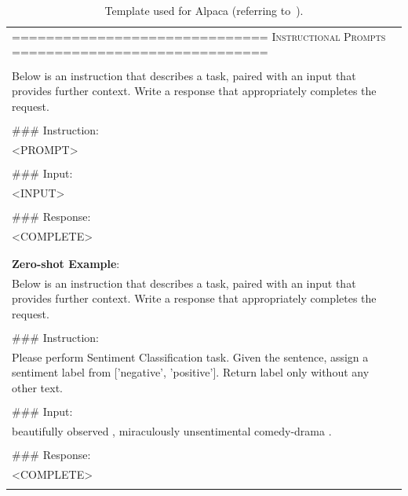     
    

\begin{table}[!htbp]
\small
    \centering
    \colorbox{gray!8}{
    \begin{tabular}{@{}p{\textwidth}}
    \toprule
    
    
    ============================== 
    \textsc{Instructional Prompts} ============================== \\\\

    Below is an instruction that describes a task, paired with an input that provides further context. Write a response that appropriately completes the request.\\\\

    $\#\#\#$ Instruction: \\
    <PROMPT> \\\\
    
    $\#\#\#$ Input:  \\
    <INPUT> \\\\
    
    $\#\#\#$ Response:  \\
    <COMPLETE> \\\\

    \midrule \\
    \textbf{Zero-shot Example}: \\
    Below is an instruction that describes a task, paired with an input that provides further context. Write a response that appropriately completes the request.\\\\

    $\#\#\#$ Instruction: \\
    Please perform Sentiment Classification task. Given the sentence, assign a sentiment label from [’negative’,
’positive’]. Return label only without any other text. \\\\
    
    $\#\#\#$ Input:  \\
    beautifully observed , miraculously unsentimental comedy-drama . \\\\
    
    $\#\#\#$ Response:  \\
    <COMPLETE> \\\\
    
    \bottomrule
    \end{tabular}
    }
    \caption{Template used for Alpaca (referring to~\citet{alpaca}). }
    \label{tab:alpaca-temp}


\end{table}